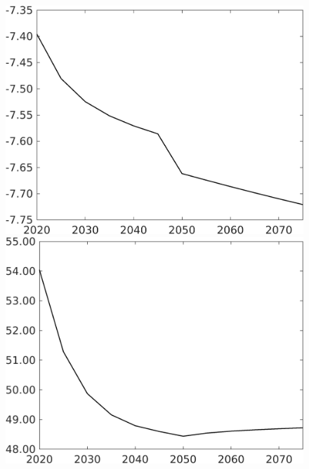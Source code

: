 \documentclass[12pt]{article}
\begin{document}
\begin{figure}[h!!]
	\begin{minipage}[]{0.32\textwidth}
		\includegraphics[width=1\textwidth]{../../codding_model/own_basedOnFried/optimalPol_010922_revision/figures/all_13Sept22/CompTaufPER_bytaul_Equlab_Reg0_C_spillover0_nsk0_xgr0_knspil0_sep0_LFlimit1_emsbase0_countec0_GovRev0_etaa0.79_lgd0.png}
	\end{minipage}		
	\begin{minipage}[]{0.32\textwidth}
		\includegraphics[width=1\textwidth]{../../codding_model/own_basedOnFried/optimalPol_010922_revision/figures/all_13Sept22/CompTaufPER_bytaul_Equlab_Reg0_sff_spillover0_nsk0_xgr0_knspil0_sep0_LFlimit1_emsbase0_countec0_GovRev0_etaa0.79_lgd0.png}

\end{minipage}
\end{figure}
\end{document}
